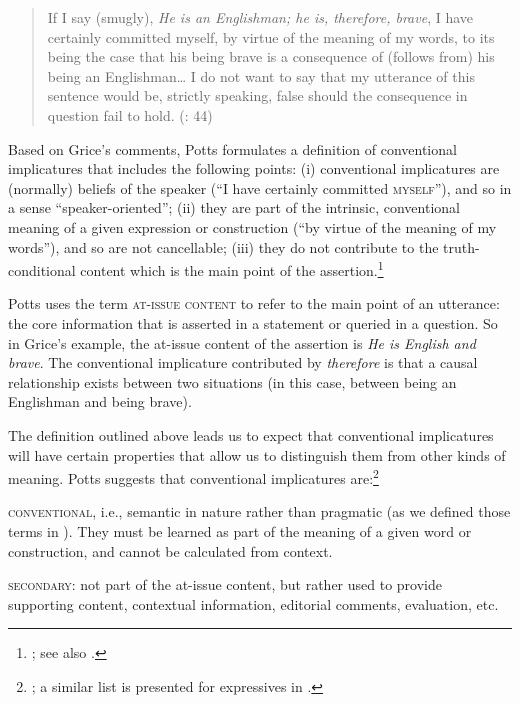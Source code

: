 \begin{quote}
If I say (smugly), \textit{He is an Englishman; he is, therefore, brave}, I have certainly committed myself, by virtue of the meaning of my words, to its being the case that his being brave is a consequence of (follows from) his being an Englishman…  I do not want to say that my utterance of this sentence would be, strictly speaking, false should the consequence in question fail to hold.  (\citealt{Grice1975}: 44)
\end{quote}


Based on Grice’s comments, Potts formulates a definition of conventional implicatures that includes the following points: (i) conventional implicatures are (normally) beliefs of the speaker (“I have certainly committed \textsc{myself}”), and so in a sense “speaker-oriented”; (ii) they are part of the intrinsic, conventional meaning of a given expression or construction (“by virtue of the meaning of my words”), and so are not cancellable; (iii) they do not contribute to the truth-conditional content which is the main point of the assertion.\footnote{\citet{Potts2005,Potts2012}; see also \citet[39]{Horn1997}.}



Potts uses the term \textsc{at-issue content} to refer to the main point of an utterance: the core information that is asserted in a statement or queried in a question. So in Grice’s example, the at-issue content of the assertion is \textit{He is English and brave}. The conventional implicature contributed by \textit{therefore} is that a causal relationship exists between two situations (in this case, between being an Englishman and being brave).



The definition outlined above leads us to expect that conventional implicatures will have certain properties that allow us to distinguish them from other kinds of meaning. Potts suggests that conventional implicatures are:\footnote{\citet{Potts2015}; a similar list is presented for expressives in \citet{Potts2007c}.}


\textsc{conventional}, i.e., semantic in nature rather than pragmatic (as we defined those terms in ). They must be learned as part of the meaning of a given word or construction, and cannot be calculated from context.



\textsc{secondary}: not part of the at-issue content, but rather used to provide supporting content, contextual information, editorial comments, evaluation, etc.




